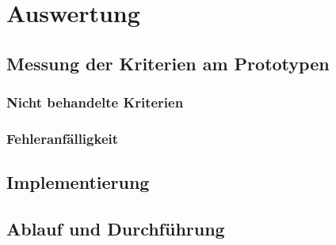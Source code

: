 \chapter{Auswertung}
\section{Messung der Kriterien am Prototypen}
\subsection{Nicht behandelte Kriterien}
\subsection{Fehleranfälligkeit}
\section{Implementierung}
\section{Ablauf und Durchführung}
